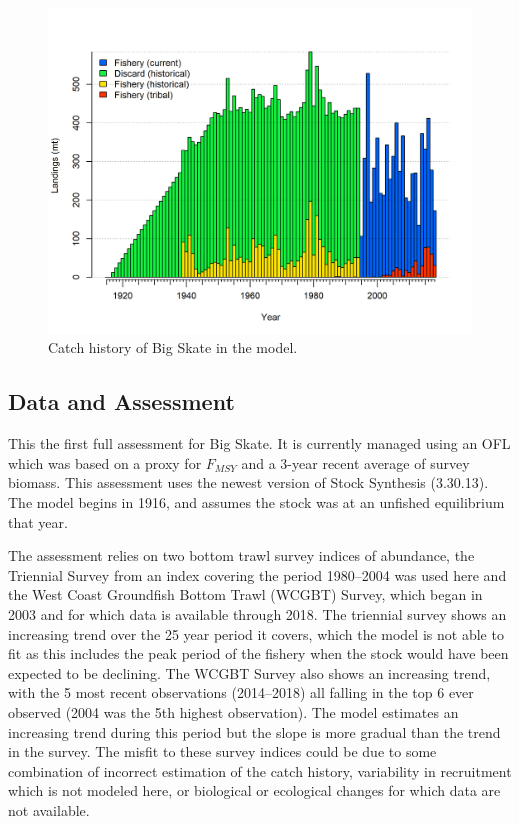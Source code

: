 \documentclass[12pt,]{article}
\begin{document}
\begin{figure}
\centering
\includegraphics{r4ss/plots_mod1/catch2 landings stacked.png}
\caption{Catch history of Big Skate in the model.
\label{fig:r4ss_catches}}
\end{figure}

\FloatBarrier

\newpage

\hypertarget{data-and-assessment}{%
\subsection*{Data and Assessment}\label{data-and-assessment}}

This the first full assessment for Big Skate. It is currently managed
using an OFL which was based on a proxy for \(F_{MSY}\) and a 3-year
recent average of survey biomass. This assessment uses the newest
version of Stock Synthesis (3.30.13). The model begins in 1916, and
assumes the stock was at an unfished equilibrium that year.

The assessment relies on two bottom trawl survey indices of abundance,
the Triennial Survey from an index covering the period 1980--2004 was
used here and the West Coast Groundfish Bottom Trawl (WCGBT) Survey,
which began in 2003 and for which data is available through 2018. The
triennial survey shows an increasing trend over the 25 year period it
covers, which the model is not able to fit as this includes the peak
period of the fishery when the stock would have been expected to be
declining. The WCGBT Survey also shows an increasing trend, with the 5
most recent observations (2014--2018) all falling in the top 6 ever
observed (2004 was the 5th highest observation). The model estimates an
increasing trend during this period but the slope is more gradual than
the trend in the survey. The misfit to these survey indices could be due
to some combination of incorrect estimation of the catch history,
variability in recruitment which is not modeled here, or biological or
ecological changes for which data are not available.
\end{document}
